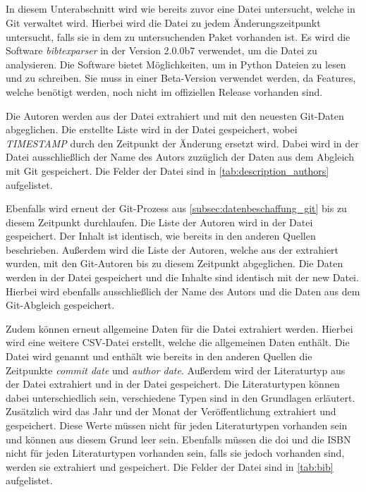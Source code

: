 \subsection{}
\label{subsec:datenbeschaffung_bibtex}
In diesem Unterabschnitt wird wie bereits zuvor eine Datei untersucht, welche in Git verwaltet wird.
Hierbei wird die  Datei zu jedem Änderungszeitpunkt untersucht, falls sie in dem zu untersuchenden Paket vorhanden ist.
Es wird die Software \emph{bibtexparser} in der Version 2.0.0b7 verwendet, um die  Datei zu analysieren.
Die Software bietet Möglichkeiten, um in Python  Dateien zu lesen und zu schreiben.
Sie muss in einer Beta-Version verwendet werden, da Features, welche benötigt werden, noch nicht im offiziellen Release vorhanden sind.

Die Autoren werden aus der  Datei extrahiert und mit den neuesten Git-Daten abgeglichen.
Die erstellte Liste wird in der Datei  gespeichert, wobei \emph{TIMESTAMP} durch den Zeitpunkt der Änderung ersetzt wird.
Dabei wird in der Datei ausschließlich der Name des Autors zuzüglich der Daten aus dem Abgleich mit Git gespeichert.
Die Felder der Datei sind in \autoref{tab:description_authors} aufgelistet.

Ebenfalls wird erneut der Git-Prozess aus \autoref{subsec:datenbeschaffung_git} bis zu diesem Zeitpunkt durchlaufen.
Die Liste der Autoren wird in der Datei  gespeichert.
Der Inhalt ist identisch, wie bereits in den anderen Quellen beschrieben.
Außerdem wird die Liste der Autoren, welche aus der  extrahiert wurden, mit den Git-Autoren bis zu diesem Zeitpunkt abgeglichen.
Die Daten werden in der Datei  gespeichert und die Inhalte sind identisch mit der \glqq new\grqq{} Datei.
Hierbei wird ebenfalls ausschließlich der Name des Autors und die Daten aus dem Git-Abgleich gespeichert.

Zudem können erneut allgemeine Daten für die  Datei extrahiert werden.
Hierbei wird eine weitere CSV-Datei erstellt, welche die allgemeinen Daten enthält.
Die Datei wird  genannt und enthält wie bereits in den anderen Quellen die Zeitpunkte \emph{commit date} und \emph{author date}.
Außerdem wird der Literaturtyp aus der Datei extrahiert und in der Datei gespeichert.
Die Literaturtypen können dabei unterschiedlich sein, verschiedene Typen sind in den Grundlagen erläutert.
Zusätzlich wird das Jahr und der Monat der Veröffentlichung extrahiert und gespeichert.
Diese Werte müssen nicht für jeden Literaturtypen vorhanden sein und können aus diesem Grund leer sein.
Ebenfalls müssen die \gls{doi} und die ISBN nicht für jeden Literaturtypen vorhanden sein, falls sie jedoch vorhanden sind, werden sie extrahiert und gespeichert.
Die Felder der Datei sind in \autoref{tab:bib} aufgelistet.

